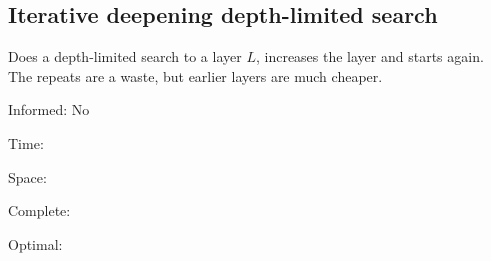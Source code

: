 
\subsection{Iterative deepening depth-limited search}

Does a depth-limited search to a layer \(L\), increases the layer and starts again. The repeats are a waste, but earlier layers are much cheaper.

Informed: No

Time:

Space:

Complete:

Optimal:

